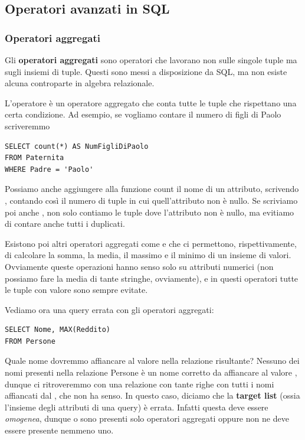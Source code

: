 \documentclass[11pt, a4paper, titlepage, oneside]{scrbook}
\begin{document}
\subsection{Operatori avanzati in SQL}

\subsubsection*{Operatori aggregati}

\begin{Definizione}
\label{def-operatori-aggregati}
Gli \textbf{operatori aggregati} sono operatori che lavorano non sulle singole tuple ma sugli insiemi di tuple. Questi sono messi a disposizione da SQL, ma non esiste alcuna controparte in algebra relazionale.
\end{Definizione}

L'operatore  è un operatore aggregato che conta tutte le tuple che rispettano una certa condizione. Ad esempio, se vogliamo contare il numero di figli di Paolo scriveremmo
\begin{lstlisting}
SELECT count(*) AS NumFigliDiPaolo
FROM Paternita
WHERE Padre = 'Paolo'
\end{lstlisting}

Possiamo anche aggiungere alla funzione count il nome di un attributo, scrivendo , contando così il numero di tuple in cui quell'attributo non è nullo. Se scriviamo poi anche , non solo contiamo le tuple dove l'attributo non è nullo, ma evitiamo di contare anche tutti i duplicati.

Esistono poi altri operatori aggregati come  e  che ci permettono, rispettivamente, di calcolare la somma, la media, il massimo e il minimo di un insieme di valori. Ovviamente queste operazioni hanno senso solo su attributi numerici (non possiamo fare la media di tante stringhe, ovviamente), e in questi operatori tutte le tuple con valore  sono sempre evitate.

Vediamo ora una query errata con gli operatori aggregati:
\begin{lstlisting}
SELECT Nome, MAX(Reddito)
FROM Persone
\end{lstlisting}

Quale nome dovremmo affiancare al valore  nella relazione risultante? Nessuno dei nomi presenti nella relazione Persone è un nome corretto da affiancare al valore , dunque ci ritroveremmo con una relazione con tante righe con tutti i nomi affiancati dal , che non ha senso. In questo caso, diciamo che la \textbf{target list} (ossia l'insieme degli attributi di una query) è errata. Infatti questa deve essere \textit{omogenea}, dunque o sono presenti solo operatori aggregati oppure non ne deve essere presente nemmeno uno.
\end{document}
